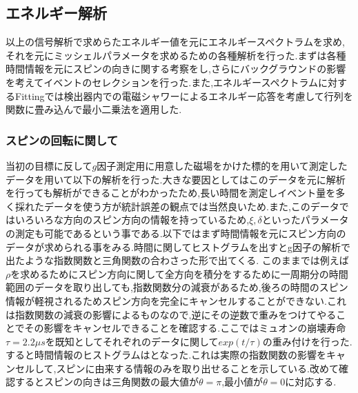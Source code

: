 %

\subsection{エネルギー解析}
以上の信号解析で求めらたエネルギー値を元にエネルギースペクトラムを求め,それを元にミッシェルパラメータを求めるための各種解析を行った.まずは各種時間情報を元にスピンの向きに関する考察をし,さらにバックグラウンドの影響を考えてイベントのセレクションを行った.また,エネルギースペクトラムに対するFittingでは検出器内での電磁シャワーによるエネルギー応答を考慮して行列を関数に畳み込んで最小二乗法を適用した.

\subsubsection{スピンの回転に関して}
当初の目標に反して$g$因子測定用に用意した磁場をかけた標的を用いて測定したデータを用いて以下の解析を行った.大きな要因としてはこのデータを元に解析を行っても解析ができることがわかったため,長い時間を測定しイベント量を多く採れたデータを使う方が統計誤差の観点では当然良いため.また,このデータではいろいろな方向のスピン方向の情報を持っているため,$\xi,\delta$といったパラメータの測定も可能であるという事である.以下ではまず時間情報を元にスピン方向のデータが求められる事をみる.時間に関してヒストグラムを出すとg因子の解析で出たような指数関数と三角関数の合わさった形で出てくる.
このままでは例えば$\rho$を求めるためにスピン方向に関して全方向を積分をするために一周期分の時間範囲のデータを取り出しても,指数関数分の減衰があるため,後ろの時間のスピン情報が軽視されるためスピン方向を完全にキャンセルすることができない.これは指数関数の減衰の影響によるものなので,逆にその逆数で重みをつけてやることでその影響をキャンセルできることを確認する.ここではミュオンの崩壊寿命$\tau=2.2\mu s$を既知としてそれぞれのデータに関して$exp(t/\tau)$の重み付けを行った.すると時間情報のヒストグラムはとなった.これは実際の指数関数の影響をキャンセルして,スピンに由来する情報のみを取り出せることを示している.改めて確認するとスピンの向きは三角関数の最大値が$\theta=\pi$,最小値が$\theta=0$に対応する.

